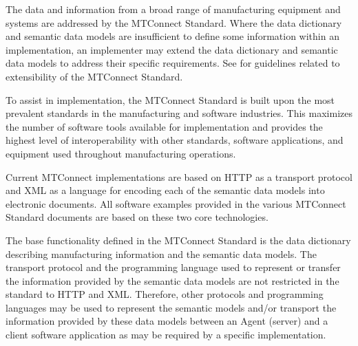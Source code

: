 The data and information from a broad range of manufacturing equipment and systems are addressed by the MTConnect Standard.  Where the \gls{data dictionary} and \glspl{semantic data model} are insufficient to define some information within an implementation, an implementer may extend the \gls{data dictionary} and \glspl{semantic data model} to address their specific requirements.  See  for guidelines related to extensibility of the MTConnect Standard.

To assist in implementation, the MTConnect Standard is built upon the most prevalent standards in the manufacturing and software industries.  This maximizes the number of software tools available for implementation and provides the highest level of interoperability with other standards, software applications, and equipment used throughout manufacturing operations.  

Current MTConnect implementations are based on HTTP as a transport protocol and \gls{XML} as a language for encoding each of the \glspl{semantic data model} into electronic documents.  All software examples provided in the various MTConnect Standard documents are based on these two core technologies.  

The base functionality defined in the MTConnect Standard is the \gls{data dictionary} describing manufacturing information and the \glspl{semantic data model}.  The transport protocol and the programming language used to represent or transfer the information provided by the \glspl{semantic data model} are not restricted in the standard to HTTP and \gls{XML}.  Therefore, other protocols and programming languages may be used to represent the semantic models and/or transport the information provided by these data models between an \gls{Agent} (server) and a client software application as may be required by a specific implementation.


